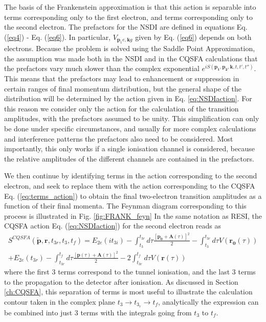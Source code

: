 \documentclass[11pt]{article}
\numberwithin{equation}{section}
\begin{document}
The basis of the Frankenstein approximation is that this action is separable into terms corresponding only to the first electron, and terms corresponding only to the second electron. The prefactors for the NSDI are defined in equations Eq. (\ref{eq4}) - Eq. (\ref{eq6}). In particular,  $V_{\mathbf{p}_1e,\mathbf{k}g}$ given by Eq. (\ref{eq6}) depends on both electrons. Because the problem is solved using the Saddle Point Approximation, the assumption was made both in the NSDI and in the CQSFA calculations that the prefactors vary much slower than the complex exponential $e^{iS(\mathbf{p_1},\mathbf{p_2},\mathbf{k},t,t',t'')}$. This means that the prefactors may lead to enhancement or suppression in certain ranges of final momentum distribution, but the general shape of the distribution will be determined by the action given in Eq. \ref{eq:NSDIaction}. For this reason we consider only the action for the calculation of the transition amplitudes, with the prefactors assumed to be unity. This simplification can only be done under specific circumstances, and usually for more complex calculations and interference patterns the prefactors also need to be considered. Most importantly, this only works if a single ionisation channel is considered, because the relative amplitudes of the different channels are contained in the prefactors.
\par
We then continue by identifying terms in the action corresponding to the second electron, and seek to replace them with the action corresponding to the CQSFA Eq. (\ref{eq:terms_action}) to obtain the final two-electron transition amplitudes as a function of their final momenta. The Feynman diagram corresponding to this process is illustrated in Fig. \ref{fig:FRANK_feyn}
In the same notation as RESI, the CQSFA action Eq. (\ref{eq:NSDIaction}) for the second electron reads as
\begin{multline} \label{eq:CQSFAaction}
    S^{CQSFA} (\tilde{\mathbf{p}}, \mathbf{r}, t_{3r}, t_3, t_f) = E_{2e}(it_{3i}) -  \int_{t_3}^{t_{3r}} d\tau \frac{[\mathbf{p_0} + \mathbf{A}(\tau)]^2}{2} - \int_{t_3}^{t_{3r}} d\tau V(\mathbf{r_0}(\tau))  \\
    + E_{2e}(t_{3r}) -\int_{t_{3r}}^{t_f} d\tau \frac{[\mathbf{p}(\tau) + \mathbf{A}(\tau)]^2}{2} - 2 \int_{t_{3r}}^{t_f} d\tau V(\mathbf{r}(\tau)) 
\end{multline}
where the first 3 terms correspond to the tunnel ionisation, and the last 3 terms to the propagation to the detector after ionisation. As discussed in Section \ref{ch:CQSFA}, this separation of terms is most useful to illustrate the calculation contour taken in the complex plane $t_3 \rightarrow t_{3_r} \rightarrow t_f$, analytically the expression can be combined into just 3 terms with the integrals going from $t_3$ to $t_f$.
\end{document}
